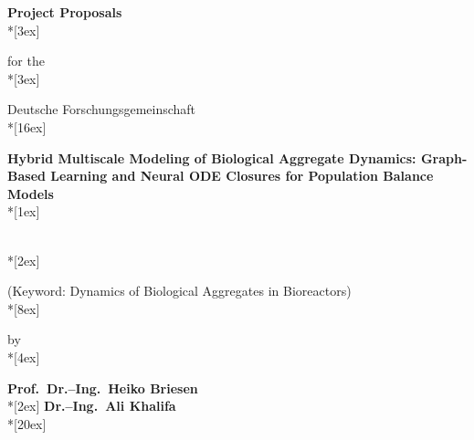 \documentclass[11pt,a4paper,twoside]{scrartcl}
\def\draftmode{false}
\begin{document}
\def\figurename{Fig.\/}




\thispagestyle{empty}

\begin{center}
\vspace*{1.cm}

{\huge \textbf{\textsf{Project Proposals}}}\\*[3ex]

{\large {\textsf{for the}}}\\*[3ex]

{\Large {\textsf{Deutsche Forschungsgemeinschaft}}}\\*[16ex]

{\LARGE\textbf{\textsf{Hybrid Multiscale Modeling of Biological Aggregate Dynamics: Graph-Based Learning and Neural ODE Closures for Population Balance Models}}}\\*[1ex]


		
{\LARGE \textbf{\textsf{ }}}\\*[2ex]

        {\large\textsf{(Keyword: Dynamics of Biological Aggregates in Bioreactors)}}\\*[8ex]


{\large \textsf{by}}\\*[4ex]


{\large \textbf{\textsf{Prof.\ Dr.--Ing.\ Heiko Briesen}}}\\*[2ex]
{\large \textbf{\textsf{Dr.--Ing.\ Ali Khalifa}}}\\*[20ex]




\end{center}
\end{document}
